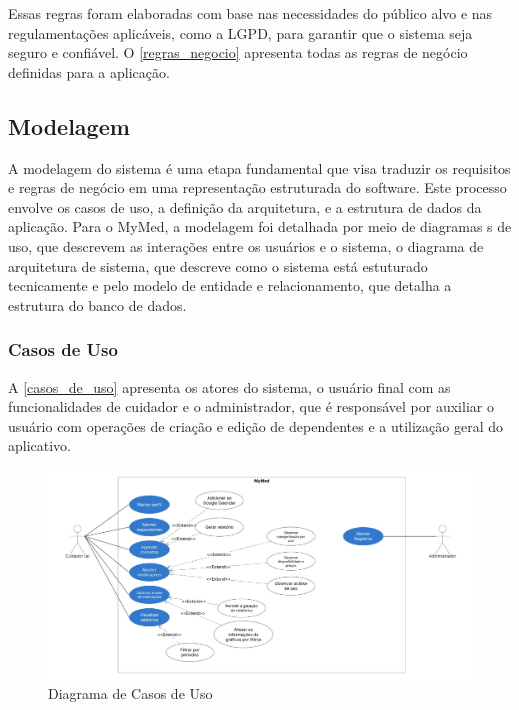 \documentclass[
	article,			%
	12pt,				%
	oneside,			%
	a4paper,			%
    BIBLATEX,           %
	english,			%
	brazil,				%
	sumario=tradicional
	]{abntex2}
\newcommand\nomeprojeto{MyMed}
\begin{document}
Essas regras foram elaboradas com base nas necessidades do público alvo e nas regulamentações aplicáveis, como a LGPD, para garantir que o sistema seja seguro e confiável. O \autoref{regras_negocio} apresenta todas as regras de negócio definidas para a aplicação.

\subsection{Modelagem}

A modelagem do sistema é uma etapa fundamental que visa traduzir os requisitos e regras de negócio em uma representação estruturada do software. Este processo envolve os casos de uso, a definição da arquitetura, e a estrutura de dados da aplicação. Para o \nomeprojeto, a modelagem foi detalhada por meio de diagramas s de uso, que descrevem as interações entre os usuários e o sistema, o diagrama de arquitetura de sistema, que descreve como o sistema está estuturado tecnicamente e pelo modelo de entidade e relacionamento, que detalha a estrutura do banco de dados.

\subsubsection{Casos de Uso}

A \autoref{casos_de_uso} apresenta os atores do sistema, o usuário final com as funcionalidades de cuidador e o administrador, que é responsável por auxiliar o usuário com operações de criação e edição de dependentes e a utilização geral do aplicativo.

\begin{figure}[!htbp]
    \centering
    \includegraphics[width=1.0\linewidth]{Figuras/diagrama-casos-uso.jpg}
    \caption{Diagrama de Casos de Uso}
    \label{casos_de_uso}
\end{figure}
\end{document}
